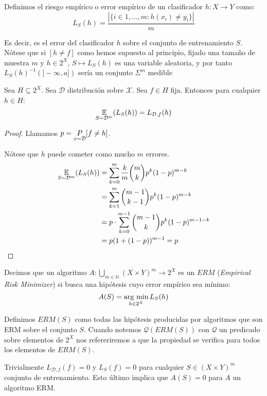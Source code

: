 \begin{definition}
Definimos el riesgo empírico o error empírico de un clasificador $h:X \rightarrow Y$ como:
\[
  L_S(h) = \frac{|\{i\in {1,\ldots, m}: h(x_i) \neq y_i\}|}{m}
\]
\end{definition}

Es decir, es el error del clasificador $h$ sobre el conjunto de entrenamiento $S$. Nótese que si $[h\neq f]$ como hemos
supuesto al principio, fijado una tamaño de muestra $m$ y $h\in 2^X$, $S \mapsto L_S(h)$ es una variable aleatoria, y por
tanto $L_S(h)^{-1}(]-\infty, a])$ sería un conjunto $\Sigma^m$ medible

\begin{fact}
Sea $H\subseteq 2^X$. Sea $\mathcal{D}$ distribución sobre $\mathcal{X}$. Sea $f \in H$ fija. Entonces para
cualquier $h\in H$:
\[
  \underset{S\sim \mathcal{D}^m}{\mathbb{E}}(L_S(h)) = L_{\mathcal{D},f}(h)
\]
\label{fact:expect-error}
\end{fact}

  \begin{proof}
   Llamamos $p= \underset{x\sim \mathcal{D}}{P} [f\neq h]$.

   Nótese que $h$ puede cometer como mucho $m$ errores.
   \begin{align*}
   \underset{S\sim \mathcal{D}^m}{\mathbb{E}}(L_S(h)) &= \sum_{k=0}^m \frac{k}{m} \binom{m}{k} p^k(1-p)^{m-k}\\
                    &= \sum_{k=1}^m \binom{m-1}{k-1} p^k(1-p)^{m-k} \\
                    &= p\cdot \sum_{k=0}^{m-1} \binom{m-1}{k} p^{k}(1-p)^{m-1-k}\\
                    &= p(1+(1-p))^{m-1} = p
   \end{align*}
  \end{proof}


\begin{definition}
Decimos que un algoritmo $A: \underset{m\in \mathbb{N}}{\bigcup} (X\times Y)^m \rightarrow 2^{X}$ es un $ERM$ 
(\textit{Empirical Risk Minimizer}) si busca una hipótesis cuyo error empírico sea mínimo:
\[
  A(S) = \operatorname*{arg\,\min}_{h\in 2^X} L_S(h)
\]
\end{definition}

Definimos $ERM(S)$ como todas las hipótesis producidas por algoritmos que son ERM
sobre el conjunto $S$. Cuando notemos $\mathcal{Q}(ERM(S))$ con $\mathcal{Q}$ un predicado sobre elementos 
de $2^X$ nos refereriremos a que la propiedad se verifica para todos los elementos de $ERM(S)$.

Trivialmente $L_{\mathcal{D},f}(f) = 0$ y $L_S(f) = 0$ para cualquier $S \in (X \times Y)^m$ conjunto de entrenamiento.
Esto último implica que $A(S) = 0$ para $A$ un algoritmo ERM.

